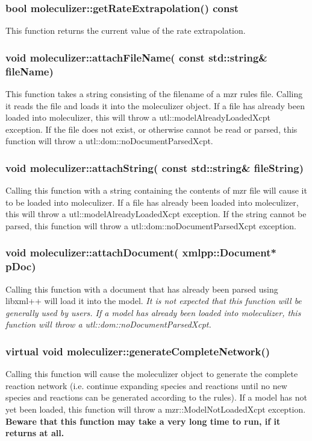 \subsubsection{bool moleculizer::getRateExtrapolation() const}
This function returns the current value of the rate extrapolation.

\subsubsection{void moleculizer::attachFileName( const std::string\&
  fileName)}

This function takes a string consisting of the filename of a mzr rules
file.  Calling it reads the file and loads it into the moleculizer
object.  If a file has already been loaded into moleculizer, this will
throw a utl::modelAlreadyLoadedXcpt exception.  If the file does not
exist, or otherwise cannot be read or parsed, this function will throw
a utl::dom::noDocumentParsedXcpt.

\subsubsection{void moleculizer::attachString( const std::string\&
  fileString)}
Calling this function with a string containing the contents of mzr
file will cause it to be loaded into moleculizer.  If a file has
already been loaded into moleculizer, this will throw a
utl::modelAlreadyLoadedXcpt exception.  If the string cannot be
parsed, this function will throw a utl::dom::noDocumentParsedXcpt
exception.

\subsubsection{void moleculizer::attachDocument( xmlpp::Document*
  pDoc)}
Calling this function with a document that has already been parsed
using libxml++ will load it into the model.  \em{It is not expected
  that this function will be generally used by users}.  If a model has
already been loaded into moleculizer, this function will throw a
utl::dom::noDocumentParsedXcpt. 

\subsubsection{virtual void moleculizer::generateCompleteNetwork()}
Calling this function will cause the moleculizer object to generate
the complete reaction network (i.e. continue expanding species and
reactions until no new species and reactions can be generated
according to the rules).  If a model has not yet been loaded, this
function will throw a mzr::ModelNotLoadedXcpt exception.
\textbf{Beware that this function may take a very long time to run, if
  it returns at all.}  

